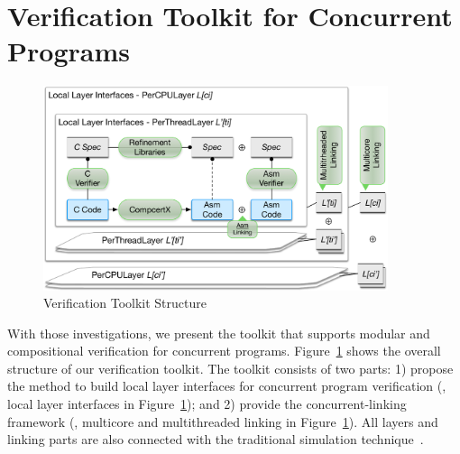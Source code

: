%
%
%
%


\section{Verification Toolkit for Concurrent Programs}
\label{chapter:introduction:sec:verification-toolkit-for-concurrent-programs}

\begin{figure}
\begin{center}
\includegraphics[width=0.9\textwidth]{figs/introfigures}
\end{center}
\caption{Verification Toolkit Structure}
\label{chapter:intro:verification-toolkit-structure} 
\end{figure}

With those investigations, we present the toolkit that supports modular and compositional verification for concurrent programs. 
Figure~\ref{chapter:intro:verification-toolkit-structure}  shows the overall structure of our verification toolkit. 
The toolkit consists of two parts: 1) propose the method to build local layer interfaces for concurrent program verification (\ie, local layer interfaces in Figure~\ref{chapter:intro:verification-toolkit-structure}); and 
2) provide the concurrent-linking framework (\ie, multicore and multithreaded linking in Figure~\ref{chapter:intro:verification-toolkit-structure}).
All layers and linking parts are also connected with the traditional simulation 
technique~\cite{compcert, deepspec}. 
 
